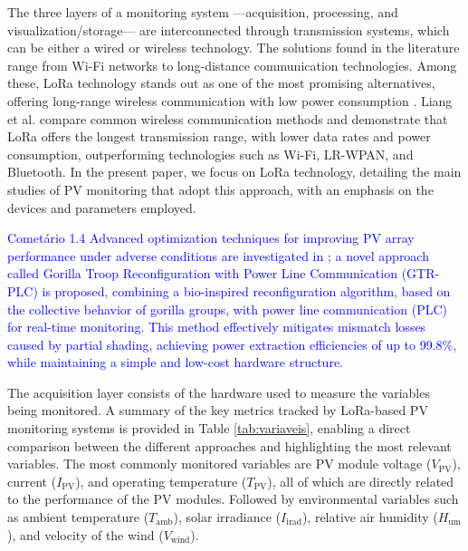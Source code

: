 \documentclass{ieeeaccess}
\begin{document}
The three layers of a monitoring system —acquisition, processing, and visualization/storage— are interconnected through transmission systems, which can be either a wired or wireless technology. The solutions found in the literature range from Wi-Fi networks \cite{dupont2018internet,pereira2019iot} to long-distance communication technologies. Among these, LoRa technology stands out as one of the most promising alternatives, offering long-range wireless communication with low power consumption \cite{hamed2024solar}. Liang et al. \cite{liang2020performance} compare common wireless communication methods and demonstrate that LoRa offers the longest transmission range, with lower data rates and power consumption, outperforming technologies such as Wi-Fi, LR-WPAN, and Bluetooth. In the present paper, we focus on LoRa technology, detailing the main studies of PV monitoring that adopt this approach, with an emphasis on the devices and parameters employed.

\textcolor{blue}{Cometário 1.4}
\textcolor{blue}{
Advanced optimization techniques for improving PV array performance under adverse conditions are investigated in \cite{aljafari2024}; a novel approach called Gorilla Troop Reconfiguration with Power Line Communication (GTR-PLC) is proposed, combining a bio-inspired reconfiguration algorithm, based on the collective behavior of gorilla groups, with power line communication (PLC) for real-time monitoring. This method effectively mitigates mismatch losses caused by partial shading, achieving power extraction efficiencies of up to 99.8\%, while maintaining a simple and low-cost hardware structure.
}


The acquisition layer consists of the hardware used to measure the variables being monitored. A summary of the key metrics tracked by LoRa-based PV monitoring systems is provided in Table \ref{tab:variaveis}, enabling a direct comparison  between the different approaches and highlighting the most relevant variables. The most commonly monitored variables are PV module voltage ($V_\text{PV}$), current ($I_\text{PV}$), and operating temperature ($T_\text{PV}$), all of which are directly related to the performance of the PV modules. Followed by environmental variables such as ambient temperature ($T_\text{amb}$), solar irradiance ($I_\text{irad}$), relative air humidity ($H_\text{um}$), and velocity of the wind ($V_\text{wind}$).
\end{document}
